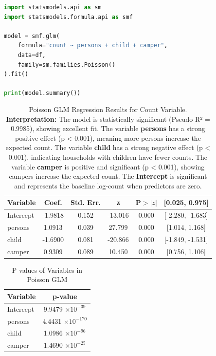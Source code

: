 \documentclass[12pt,a4paper]{report}
\begin{document}
\begin{lstlisting}[language=Python, caption=Poisson Regression Model in Python]
import statsmodels.api as sm
import statsmodels.formula.api as smf

model = smf.glm(
    formula="count ~ persons + child + camper",
    data=df,
    family=sm.families.Poisson()
).fit()

print(model.summary())
\end{lstlisting}
\begin{table}[h!]
\centering
\begin{tabular}{|l|c|c|c|c|c|}
\hline
\textbf{Variable} & \textbf{Coef.} & \textbf{Std. Err.} & \textbf{z} & \textbf{P$>|z|$} & \textbf{[0.025, 0.975]} \\ \hline
Intercept & -1.9818 & 0.152 & -13.016 & 0.000 & [-2.280, -1.683] \\ \hline
persons   &  1.0913 & 0.039 &  27.799 & 0.000 & [1.014, 1.168]   \\ \hline
child     & -1.6900 & 0.081 & -20.866 & 0.000 & [-1.849, -1.531] \\ \hline
camper    &  0.9309 & 0.089 &  10.450 & 0.000 & [0.756, 1.106]   \\ \hline
\end{tabular}
\caption{Poisson GLM Regression Results for Count Variable. 
\newline \textbf{Interpretation:} 
The model is statistically significant (Pseudo R² = 0.9985), showing excellent fit. 
\newline The variable \textbf{persons} has a strong positive effect (p < 0.001), meaning more persons increase the expected count. 
\newline The variable \textbf{child} has a strong negative effect (p < 0.001), indicating households with children have fewer counts. 
\newline The variable \textbf{camper} is positive and significant (p < 0.001), showing campers increase the expected count. 
\newline The \textbf{Intercept} is significant and represents the baseline log-count when predictors are zero.}
\label{tab:poisson_glm_results}
\end{table}
\clearpage
\begin{table}[h!]
\centering
\begin{tabular}{|l|c|}
\hline
\textbf{Variable} & \textbf{p-value} \\ \hline
Intercept & 9.9479 $\times 10^{-39}$ \\ \hline
persons   & 4.4431 $\times 10^{-170}$ \\ \hline
child     & 1.0986 $\times 10^{-96}$ \\ \hline
camper    & 1.4690 $\times 10^{-25}$ \\ \hline
\end{tabular}
\caption{P-values of Variables in Poisson GLM}
\label{tab:pvalues_poisson}
\end{table}
\end{document}
